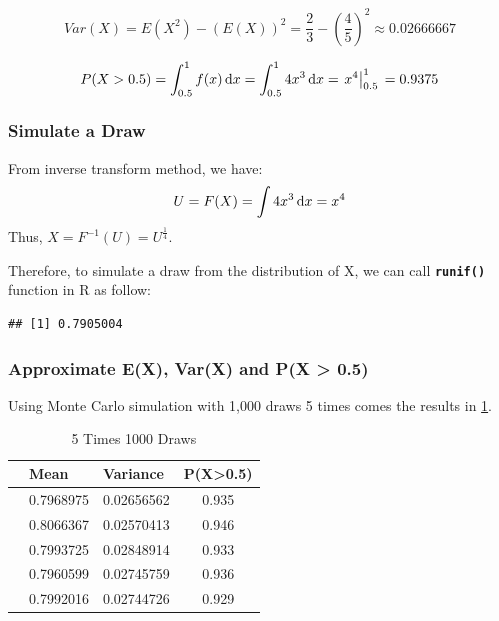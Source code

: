 \documentclass[12pt,letterpaper,titlepage,en-US]{article}
\begin{document}
\begin{equation}
Var(X) = E(X^2) - (E(X))^2
     = \frac{2}{3} - \left(\frac{4}{5}\right)^2
     \approx 0.02666667
\end{equation}

\begin{equation}
P(X > 0.5) =\int_{0.5}^1 f(x) \mathop{}\!\mathrm{d} x \\
     =\int_{0.5}^1 4x^3 \mathop{}\!\mathrm{d} x \\
     = \left.x^4\right|_{0.5}^1 \\
     = 0.9375
\end{equation}

\subsubsection{Simulate a Draw}
From inverse transform method, we have:
\[U = F(X) = \int 4x^3 \mathop{}\!\mathrm{d} x = x^4\]
Thus, $\displaystyle X = F^{-1}(U) = U^{\frac{1}{4}}$.

Therefore, to simulate a draw from the distribution of X, we can call \texttt{\textbf{runif()}} function in R as follow:
\begin{knitrout}
\color{fgcolor}\begin{kframe}
\begin{alltt}
\hlstd{(}\hlstd{)}\hlopt{^}\hlstd{(}\hlopt{/}\hlstd{)}
\end{alltt}
\begin{verbatim}
## [1] 0.7905004
\end{verbatim}
\end{kframe}
\end{knitrout}

\subsubsection{Approximate E(X), Var(X) and P(X > 0.5)}
Using Monte Carlo simulation with 1,000 draws 5 times comes the results in \cref{11000}.
\begin{table}[H]
\centering
\begin{tabular}{|l|l|l|c|}
\hline
          &Mean   &Variance &P(X>0.5) \\\hline
[1,] &0.7968975 &0.02656562    &0.935 \\\hline
[2,] &0.8066367 &0.02570413    &0.946 \\\hline
[3,] &0.7993725 &0.02848914    &0.933 \\\hline
[4,] &0.7960599 &0.02745759    &0.936 \\\hline
[5,] &0.7992016 &0.02744726    &0.929 \\\hline
\end{tabular}
\caption{5 Times 1000 Draws}\label{11000}
\end{table}
\end{document}
